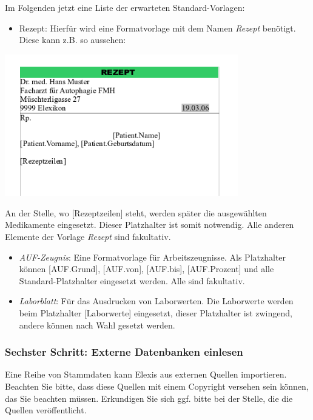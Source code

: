 Im Folgenden jetzt eine Liste der erwarteten Standard-Vorlagen:

\begin{itemize}
\item Rezept: Hierfür wird eine Formatvorlage mit dem Namen \textit{Rezept} benötigt. Diese kann z.B. so aussehen:
 \end{itemize}
\includegraphics[width=4in]{images/rezept.png}

An der Stelle, wo [Rezeptzeilen] steht, werden später die ausgewählten Medikamente eingesetzt. Dieser Platzhalter ist somit notwendig. Alle anderen Elemente der Vorlage \textit{Rezept} sind fakultativ.

\begin{itemize}
 \item \textit{AUF-Zeugnis}: Eine Formatvorlage für Arbeitszeugnisse. Als Platzhalter können [AUF.Grund], [AUF.von], [AUF.bis], [AUF.Prozent] und alle Standard-Platzhalter eingesetzt werden. Alle sind fakultativ.


 \item \textit{Laborblatt}: Für das Ausdrucken von Laborwerten. Die Laborwerte werden beim Platzhalter [Laborwerte] eingesetzt, dieser Platzhalter ist zwingend, andere können nach Wahl gesetzt werden.
\end{itemize}

\subsubsection{Sechster Schritt: Externe Datenbanken einlesen}

Eine Reihe von Stammdaten kann Elexis aus externen Quellen importieren. Beachten Sie bitte, dass diese Quellen mit 
einem Copyright versehen sein können, das Sie beachten müssen. Erkundigen Sie sich ggf. bitte bei der Stelle, die die 
Quellen veröffentlicht.

